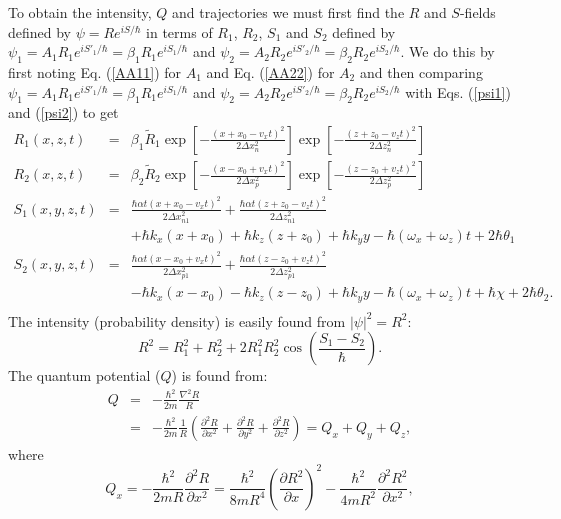 \documentclass[12pt]{article}       %
\begin{document}
To obtain the intensity, $Q$ and trajectories we must first find the $R$ and $S$-fields defined by $\psi=Re^{iS/\hbar}$ in terms of $R_1$, $R_2$, $S_1$ and $S_2$ defined by $\psi_1=A_1 R_1e^{iS'_1/\hbar}  =\beta_1R_1e^{iS_1/\hbar}$ and $\psi_2=A_2 R_2e^{iS'_2/\hbar} =\beta_2 R_2e^{iS_2/\hbar}$. We do this by first noting Eq. (\ref{AA11}) for $A_1$ and Eq. (\ref{AA22}) for $A_2$ and then comparing  $\psi_1=A_1 R_1e^{iS'_1/\hbar}  =\beta_1R_1e^{iS_1/\hbar}$ and $\psi_2=A_2 R_2e^{iS'_2/\hbar} =\beta_2 R_2e^{iS_2/\hbar}$ with Eqs. (\ref{psi1}) and (\ref{psi2}) to  get
\begin{eqnarray}
R_1(x,z,t)&=& \beta_1 \tilde{R}_{1}\exp\left[{-\frac{(x+x_0-v_x t)^2}{2\Delta x_n^2}}\right]\exp\left[{-  \frac{(z+z_0-v_z t)^2}{2\Delta z_n^2}}\right] \nonumber\\
R_2(x,z,t)&=& \beta_2 \tilde{R}_{2}\exp\left[{-\frac{(x-x_0+v_x t)^2}{2\Delta x_p^2}}\right] \exp\left[{- \frac{(z-z_0+v_z t)^2}{2\Delta z_p^2}} \right]      \nonumber\\
S_1(x,y,z,t)&=&{\frac{\hbar\alpha t(x+x_0-v_x t)^2}{2\Delta x_{n1}^2}}+{\frac{\hbar\alpha t(z+z_0-v_z t)^2}{2\Delta z_{n1}^2}}\nonumber\\
&& + \hbar k_x(x+x_0)+\hbar k_z(z+z_0)+\hbar k_y y-\hbar(\omega_x+\omega_z) t+2\hbar\theta_1\nonumber  \nonumber\\
S_2(x,y,z,t)&=&\frac{\hbar\alpha t(x-x_0+v_x t)^2}{2\Delta x_{p1}^2}+\frac{\hbar\alpha t(z-z_0+v_z t)^2}{2\Delta z_{p1}^2}\nonumber\\
&&-\hbar k_x(x-x_0)-\hbar k_z(z-z_0)+\hbar k_y y-\hbar(\omega_x+\omega_z) t+\hbar\chi+2\hbar\theta_2.  \nonumber\\
\end{eqnarray}
The intensity (probability density) is easily found from $|\psi|^2=R^2$:
\begin{equation}
R^2= R_1^2+R_2^2+2R_1^2R_2^2\cos\left( \frac{S_1-S_2}{\hbar}\right).\label{RSQ}
\end{equation}
The quantum potential ($Q$) is found from:
\begin{eqnarray}
Q&=&-\frac{\hbar^{2}}{2m}\frac{\nabla^{2} R}{R}\nonumber\\
&=&-\frac{\hbar^{2}}{2m}\frac{1}{R}\left(\frac{\partial^2  R}{\partial x^2}+   \frac{\partial^2  R}{\partial y^2}+ \frac{\partial^2  R}{\partial z^2}  \right)=Q_x+Q_y+Q_z,\nonumber
\end{eqnarray}
where
\begin{equation}
Q_x=-\frac{\hbar^{2}}{2mR}\frac{\partial^2  R}{\partial x^2}=\frac{\hbar^{2}}{8mR^4}\left(\frac{\partial  R^2}{\partial x}\right)^2 -\frac{\hbar^{2}}{4mR^2}\frac{\partial^2  R^2}{\partial x^2}, \label{QPF}
\end{equation}
\end{document}
